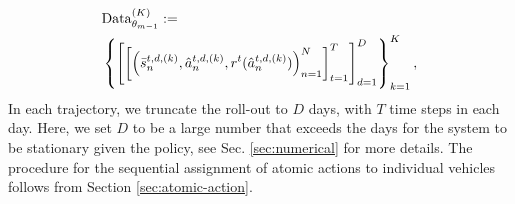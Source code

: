 \begin{align} \label{eq:ppo-data}
    &\mathrm{Data}^{(K)}_{\theta_{m-1}} := \nonumber\\ 
    &\left\{\left[\left[\left(\bar{s}^{t, d, (k)}_{n}, \hat{a}^{t, d, (k)}_{n}, r^t(\hat{a}^{t, d, (k)}_{n}) \right)_{n = 1}^{N} \right]_{t = 1}^{T} \right]_{d=1}^{D} \right\}_{k = 1}^K,
\end{align}
In each trajectory, we truncate the roll-out to $D$ days, with $T$ time steps in each day. Here, we set $D$ to be a large number that exceeds the days for the system to be stationary given the policy, see Sec. \ref{sec:numerical} for more details. The procedure for the sequential assignment of atomic actions to individual vehicles follows from Section \ref{sec:atomic-action}.
